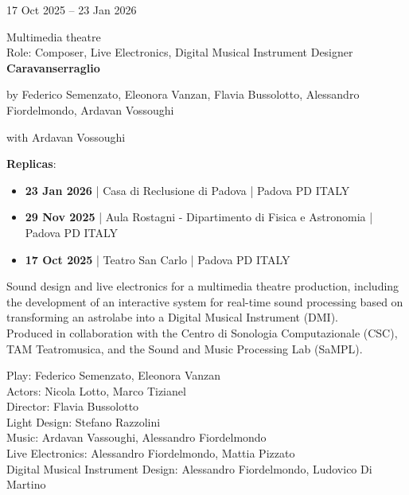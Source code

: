 \documentclass[7pt,a4paper]{article}
\begin{document}
\begin{mdframed}[
    backgroundcolor=white,
    linecolor=white,
    linewidth=0pt,
    innerleftmargin=6pt,
    innerrightmargin=6pt,
    innertopmargin=6pt,
    innerbottommargin=6pt,
    skipabove=0pt,
    skipbelow=0pt
]

\begin{minipage}[t]{0.28\textwidth}

17 Oct 2025 – 23 Jan 2026


\end{minipage}
\begin{minipage}[t]{0.68\textwidth}
\small Multimedia theatre
\\\scriptsize Role: Composer, Live Electronics, Digital Musical Instrument Designer
\\ \normalsize \textbf{Caravanserraglio}
\par\scriptsize by Federico Semenzato, Eleonora Vanzan, Flavia Bussolotto, Alessandro Fiordelmondo, Ardavan Vossoughi
\par\scriptsize with Ardavan Vossoughi
\vspace{0.25cm}



    \scriptsize \textbf{Replicas}:
    \begin{itemize}
    \par
        \item  \textbf{23 Jan 2026}    | Casa di Reclusione di Padova  | Padova PD ITALY
    \par
        \item  \textbf{29 Nov 2025}    | Aula Rostagni - Dipartimento di Fisica e Astronomia  | Padova PD ITALY
    \par
        \item  \textbf{17 Oct 2025}    | Teatro San Carlo  | Padova PD ITALY
    
    \end{itemize}

\vspace{0.1cm}
\scriptsize

Sound design and live electronics for a multimedia theatre production, including the development of an interactive system for real-time sound processing based on transforming an astrolabe into a Digital Musical Instrument (DMI).\\Produced in collaboration with the Centro di Sonologia Computazionale (CSC), TAM Teatromusica, and the Sound and Music Processing Lab (SaMPL).\par\vspace{2mm}Play: Federico Semenzato, Eleonora Vanzan\\Actors: Nicola Lotto, Marco Tizianel\\Director: Flavia Bussolotto\\Light Design: Stefano Razzolini\\Music: Ardavan Vassoughi, Alessandro Fiordelmondo\\Live Electronics: Alessandro Fiordelmondo, Mattia Pizzato\\Digital Musical Instrument Design: Alessandro Fiordelmondo, Ludovico Di Martino


\end{minipage}
\end{mdframed}
\end{document}
